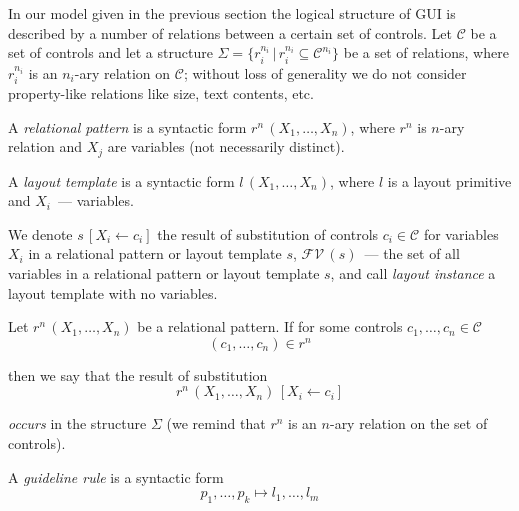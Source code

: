 

In our model given in the previous section the logical structure of GUI is described by
a number of relations between a certain set of controls. Let $\mathcal{C}$ be a set of
controls and let a structure $\Sigma=\{r^{n_i}_i\, |\, r^{n_i}_i\subseteq\mathcal{C}^{n_i}\}$ be a set of
relations, where $r^{n_i}_i$ is an \mbox{$n_i$-ary} relation on $\mathcal{C}$; without loss
of generality we do not consider property-like relations like size, text contents, etc.

A \emph{relational pattern} is a syntactic form $r^n\,(X_1,\dots,X_n)$, where $r^n$ is $n$-ary
relation and $X_j$ are variables (not necessarily distinct).

A \emph{layout template} is a syntactic form $l\,(X_1,\dots,X_n)$, where $l$ is a layout primitive and
$X_i$~--- variables.


We denote $s\,[X_i\gets c_i]$ the result of substitution of controls $c_i\in\mathcal{C}$
for variables $X_i$ in a relational pattern or layout template $s$, $\mathcal{FV}\,(s)$~--- the set of all
variables in a relational pattern or layout template $s$, and call \emph{layout instance} a layout
template with no variables.

Let $r^n\,(X_1,\dots,X_n)$ be a relational pattern. If for some controls $c_1,\dots,c_n\in\mathcal{C}$
\[
(c_1,\dots,c_n)\in r^n
\]

\noindent  then we say that the result of substitution
\[
r^n\,(X_1,\dots,X_n)\,[X_i\gets c_i]
\]

\noindent \emph{occurs} in the structure $\Sigma$ (we remind that $r^n$ is an $n$-ary relation on the set of controls).

A \emph{guideline rule} is a syntactic form
\[
p_1,\dots,p_k\mapsto l_1,\dots,l_m
\]



